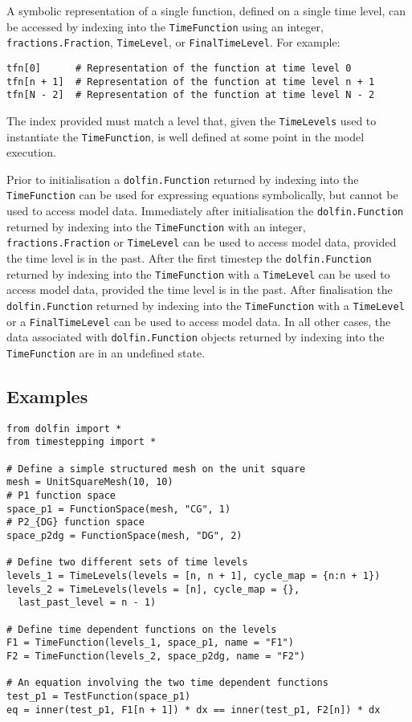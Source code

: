 \documentclass[a4paper]{book}
\begin{document}
A symbolic representation of a single function, defined on a single time level,
can be accessed by indexing into the \verb+TimeFunction+ using an integer,
\verb+fractions.Fraction+, \verb+TimeLevel+, or \verb+FinalTimeLevel+. For
example:
\begin{lstlisting}
tfn[0]      # Representation of the function at time level 0
tfn[n + 1]  # Representation of the function at time level n + 1
tfn[N - 2]  # Representation of the function at time level N - 2
\end{lstlisting}
The index provided must match a level that, given the \verb+TimeLevels+ used to
instantiate the \verb+TimeFunction+, is well defined at some point in the model
execution.

Prior to initialisation a \verb+dolfin.Function+ returned by indexing into the
\verb+TimeFunction+ can be used for expressing equations symbolically, but
cannot be used to access model data. Immediately after initialisation the
\linebreak \verb+dolfin.Function+ returned by indexing into the
\verb+TimeFunction+ with an integer, \verb+fractions.Fraction+ or
\verb+TimeLevel+ can be used to access model data, provided the time level is in
the past. After the first timestep the \verb+dolfin.Function+ returned by
indexing into the \verb+TimeFunction+ with a \verb+TimeLevel+ can be used to
access model data, provided the time level is in the past. After finalisation
the \verb+dolfin.Function+ returned by indexing into the \verb+TimeFunction+
with a \verb+TimeLevel+ or a \verb+FinalTimeLevel+ can be used to access model
data. In all other cases, the data associated with \verb+dolfin.Function+
objects returned by indexing into the \verb+TimeFunction+ are in an undefined
state.

\subsection*{Examples}

\begin{lstlisting}
from dolfin import *
from timestepping import *

# Define a simple structured mesh on the unit square
mesh = UnitSquareMesh(10, 10)
# P1 function space
space_p1 = FunctionSpace(mesh, "CG", 1)
# P2_{DG} function space
space_p2dg = FunctionSpace(mesh, "DG", 2)

# Define two different sets of time levels
levels_1 = TimeLevels(levels = [n, n + 1], cycle_map = {n:n + 1})
levels_2 = TimeLevels(levels = [n], cycle_map = {},
  last_past_level = n - 1)

# Define time dependent functions on the levels
F1 = TimeFunction(levels_1, space_p1, name = "F1")
F2 = TimeFunction(levels_2, space_p2dg, name = "F2")

# An equation involving the two time dependent functions
test_p1 = TestFunction(space_p1)
eq = inner(test_p1, F1[n + 1]) * dx == inner(test_p1, F2[n]) * dx
\end{lstlisting}
\end{document}
